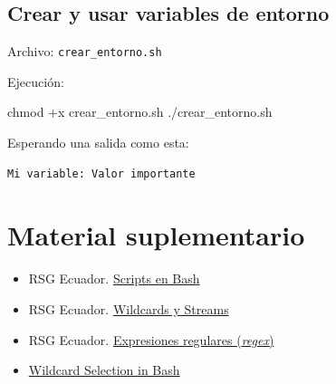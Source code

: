 \documentclass[
  spanish,
  12pt,
  letterpaper,
  DIV=11,
  numbers=noendperiod]{scrreprt}
\newenvironment{Shaded}{\begin{snugshade}}{\end{snugshade}}
\newcommand{\BuiltInTok}[1]{\textcolor[rgb]{0.00,0.23,0.31}{#1}}
\newcommand{\CommentTok}[1]{\textcolor[rgb]{0.37,0.37,0.37}{#1}}
\newcommand{\ExtensionTok}[1]{\textcolor[rgb]{0.00,0.23,0.31}{#1}}
\newcommand{\FunctionTok}[1]{\textcolor[rgb]{0.28,0.35,0.67}{#1}}
\newcommand{\NormalTok}[1]{\textcolor[rgb]{0.00,0.23,0.31}{#1}}
\newcommand{\OperatorTok}[1]{\textcolor[rgb]{0.37,0.37,0.37}{#1}}
\newcommand{\StringTok}[1]{\textcolor[rgb]{0.13,0.47,0.30}{#1}}
\newcommand{\VariableTok}[1]{\textcolor[rgb]{0.07,0.07,0.07}{#1}}
\providecommand{\tightlist}{%
  \setlength{\itemsep}{0pt}\setlength{\parskip}{0pt}}
\begin{document}
\subsection{Crear y usar variables de
entorno}\label{crear-y-usar-variables-de-entorno}

Archivo: \texttt{crear\_entorno.sh}

\begin{Shaded}
\end{Shaded}

Ejecución:

\begin{Shaded}
\begin{Highlighting}[]
\FunctionTok{chmod}\NormalTok{ +x crear\_entorno.sh}
\ExtensionTok{./crear\_entorno.sh}
\end{Highlighting}
\end{Shaded}

Esperando una salida como esta:

\begin{verbatim}
Mi variable: Valor importante
\end{verbatim}

\section{Material suplementario}\label{material-suplementario-5}

\begin{itemize}
\tightlist
\item
  RSG Ecuador.
  \href{https://rsg-ecuador.github.io/unix.bioinfo.rsgecuador/content/Curso_avanzado/02_Bash/1_bash.html}{Scripts
  en Bash}
\item
  RSG Ecuador.
  \href{https://rsg-ecuador.github.io/unix.bioinfo.rsgecuador/content/Curso_basico/03_Manejo_terminal/5_wildcards.html}{Wildcards
  y Streams}
\item
  RSG Ecuador.
  \href{https://rsg-ecuador.github.io/unix.bioinfo.rsgecuador/content/Curso_basico/04_Procesamiento_ficheros_regex_pipes/3_Expresiones_regulares.html}{Expresiones
  regulares (\emph{regex})}
\item
  \href{https://pressbooks.senecapolytechnic.ca/uli101/chapter/wildcard-selection-in-bash/}{Wildcard
  Selection in Bash}
\end{itemize}
\end{document}
